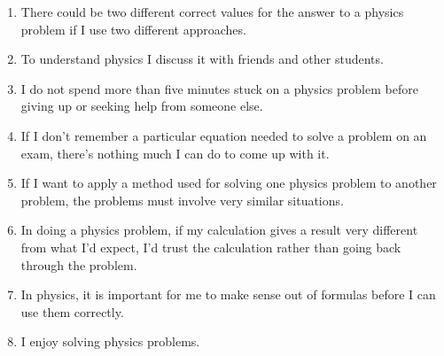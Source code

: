 \documentclass[addpoints,12pt]{exam}
\begin{document}
\begin{enumerate}
\item There could be two different correct values for the answer to a physics problem if I use two different approaches.
\begin{center}\end{center}

\item To understand physics I discuss it with friends and other students.
\begin{center}\end{center}

\item I do not spend more than five minutes stuck on a physics problem before giving up or seeking help from someone else.
\begin{center}\end{center}

\item If I don't remember a particular equation needed to solve a problem on an exam, there's nothing much I can do to come up with it.
\begin{center}\end{center}

\item If I want to apply a method used for solving one physics problem to another problem, the problems must involve very similar situations.
\begin{center}\end{center}

\item In doing a physics problem, if my calculation gives a result very different from what I'd expect, I'd trust the calculation rather than going back through the problem.
\begin{center}\end{center}

\item In physics, it is important for me to make sense out of formulas before I can use them correctly.
\begin{center}\end{center}

\item I enjoy solving physics problems.
\begin{center}\end{center}


\end{enumerate}
\end{document}
